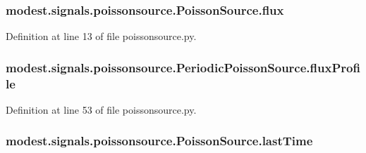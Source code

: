 \subsubsection[{\texorpdfstring{flux}{flux}}]{\setlength{\rightskip}{0pt plus 5cm}modest.\+signals.\+poissonsource.\+Poisson\+Source.\+flux\hspace{0.3cm}{\ttfamily [inherited]}}\hypertarget{classmodest_1_1signals_1_1poissonsource_1_1PoissonSource_a6f2c657ad936b921715d826ac74f7fe5}{}\label{classmodest_1_1signals_1_1poissonsource_1_1PoissonSource_a6f2c657ad936b921715d826ac74f7fe5}


Definition at line 13 of file poissonsource.\+py.

\subsubsection[{\texorpdfstring{flux\+Profile}{fluxProfile}}]{\setlength{\rightskip}{0pt plus 5cm}modest.\+signals.\+poissonsource.\+Periodic\+Poisson\+Source.\+flux\+Profile}\hypertarget{classmodest_1_1signals_1_1poissonsource_1_1PeriodicPoissonSource_a1ff79fd78ebfe4b659093620d0e03b31}{}\label{classmodest_1_1signals_1_1poissonsource_1_1PeriodicPoissonSource_a1ff79fd78ebfe4b659093620d0e03b31}


Definition at line 53 of file poissonsource.\+py.

\subsubsection[{\texorpdfstring{last\+Time}{lastTime}}]{\setlength{\rightskip}{0pt plus 5cm}modest.\+signals.\+poissonsource.\+Poisson\+Source.\+last\+Time\hspace{0.3cm}{\ttfamily [inherited]}}\hypertarget{classmodest_1_1signals_1_1poissonsource_1_1PoissonSource_a34395fc83bd8743a0a5ee69f9392a606}{}\label{classmodest_1_1signals_1_1poissonsource_1_1PoissonSource_a34395fc83bd8743a0a5ee69f9392a606}


